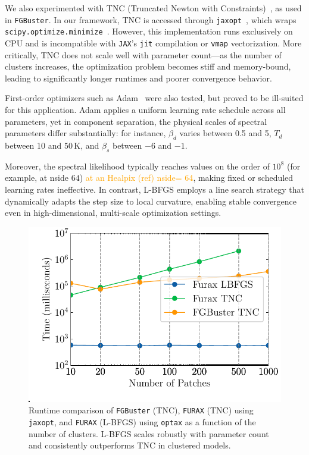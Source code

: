 \documentclass[fleqn,usenatbib]{mnras}
\newcommand{\je}[1]{\textcolor{orange}{#1}}
\begin{document}
We also experimented with TNC (Truncated Newton with Constraints)~\citep{TNC}, as used in \texttt{FGBuster}. In our framework, TNC is accessed through \texttt{jaxopt}~\citep{jaxopt}, which wraps \texttt{scipy.optimize.minimize}~\citep{scipy}. However, this implementation runs exclusively on CPU and is incompatible with \texttt{JAX}’s \texttt{jit} compilation or \texttt{vmap} vectorization. More critically, TNC does not scale well with parameter count---as the number of clusters increases, the optimization problem becomes stiff and memory-bound, leading to significantly longer runtimes and poorer convergence behavior.

First-order optimizers such as Adam~\citep{adam} were also tested, but proved to be ill-suited for this application. Adam applies a uniform learning rate schedule across all parameters, yet in component separation, the physical scales of spectral parameters differ substantially: for instance, \( \beta_d \) varies between 0.5 and 5, \( T_d \) between 10 and 50\,\(\mathrm{K}\), and \( \beta_s \) between \(-6\) and \(-1\).

Moreover, the spectral likelihood typically reaches values on the order of \( 10^8 \) (for example, at nside \( 64 \)) \je{at an Healpix (ref) nside= 64}, making fixed or scheduled learning rates ineffective. In contrast, L-BFGS employs a line search strategy that dynamically adapts the step size to local curvature, enabling stable convergence even in high-dimensional, multi-scale optimization settings.

\begin{figure}
\centering
\includegraphics[width=1\columnwidth]{figures/runtime_comparison.pdf}
\caption{Runtime comparison of \texttt{FGBuster} (TNC), \texttt{FURAX} (TNC) using \texttt{jaxopt}, and \texttt{FURAX} (L-BFGS) using \texttt{optax} as a function of the number of clusters. L-BFGS scales robustly with parameter count and consistently outperforms TNC in clustered models. }
\label{fig:runtime_comparison}
\end{figure}
\end{document}
